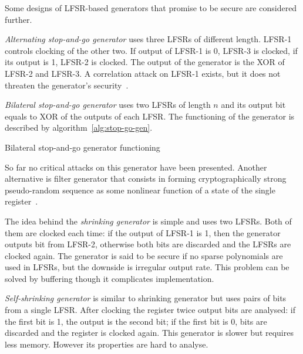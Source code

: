 Some designs of LFSR-based generators that promise to be secure are considered
further.

\textit{Alternating stop-and-go generator} uses three LFSRs of different length.
LFSR-1 controls clocking of the other two. If output of LFSR-1 is 0, LFSR-3 is
clocked, if its output is 1, LFSR-2 is clocked. The output of the generator is
the XOR of LFSR-2 and LFSR-3.  A correlation attack on LFSR-1 exists, but it
does not threaten the generator's
security~\cite{schneier:applied_cryptography:2}.

\textit{Bilateral stop-and-go generator} uses two LFSRs of length $n$ and its
output bit equals to XOR of the outputs of each LFSR. The functioning of
the generator is described by algorithm~\ref{alg:stop-go-gen}.
\begin{algorithm}
    \caption{Bilateral stop-and-go generator functioning}
    \label{alg:stop-go-gen}

    \DontPrintSemicolon

    \;
    \;
\end{algorithm}
So far no critical attacks on this generator have been presented. Another
alternative is filter generator that consists in forming cryptographically
strong pseudo-random sequence as some nonlinear function of a state of the
single register~\cite{robshaw:rsa:streamciphers}.

The idea behind the \textit{shrinking generator} is simple and uses two LFSRs.
Both of them are clocked each time: if the output of LFSR-1 is 1, then the
generator outputs bit from LFSR-2, otherwise both bits are discarded and the
LFSRs are clocked again. The generator is said to be secure if no sparse
polynomials are used in LFSRs, but the downside is irregular output rate.
This problem can be solved by buffering though it complicates implementation.

\textit{Self-shrinking generator} is similar to shrinking generator but uses
pairs of bits from a single LFSR. After clocking the register twice output bits
are analysed: if the first bit is 1, the output is the second bit; if the first
bit is 0, bits are discarded and the register is clocked again. This generator
is slower but requires less memory. However its properties are hard to analyse.

